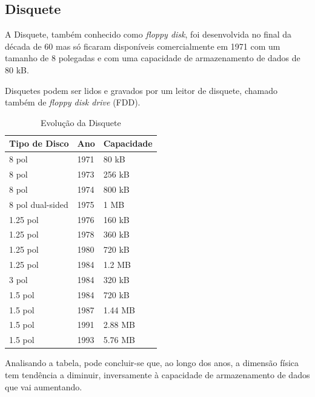 \documentclass{report}
\begin{document}
		\subsection{Disquete}
		A Disquete, também conhecido como \textit{floppy disk}, foi desenvolvida no final da década de 60 mas só ficaram disponíveis comercialmente em 1971 com um tamanho de 8 polegadas e com uma capacidade de armazenamento de dados de 80 kB.
		
		
		 Disquetes podem ser lidos e gravados por um leitor de disquete, chamado também de \textit{floppy disk drive} (FDD).
		
		
	\begin{table}[h]
		\centering
		\caption{Evolução da Disquete}
		\label{my-label}
		\begin{tabular}{|l|l|l|}
		\hline
		\textbf{Tipo de Disco} & \textbf{Ano} & \textbf{Capacidade} \\ \hline
		8 pol            & 1971 & 80 kB   \\ \hline
		8 pol            & 1973 & 256 kB  \\ \hline
		8 pol            & 1974 & 800 kB  \\ \hline
		8 pol dual-sided & 1975 & 1 MB    \\ \hline
		1.25 pol         & 1976 & 160 kB  \\ \hline
		1.25 pol         & 1978 & 360 kB  \\ \hline
		1.25 pol         & 1980 & 720 kB  \\ \hline
		1.25 pol         & 1984 & 1.2 MB  \\ \hline
		3 pol            & 1984 & 320 kB  \\ \hline
		1.5 pol          & 1984 & 720 kB  \\ \hline
		1.5 pol          & 1987 & 1.44 MB \\ \hline
		1.5 pol          & 1991 & 2.88 MB \\ \hline
		1.5 pol          & 1993 & 5.76 MB \\ \hline
		
		\end{tabular}
		\end{table}		
 
	Analisando a tabela, pode concluir-se que, ao longo dos anos, a dimensão física tem tendência a diminuir, inversamente à capacidade de armazenamento de dados que vai aumentando.
		
\end{document}
